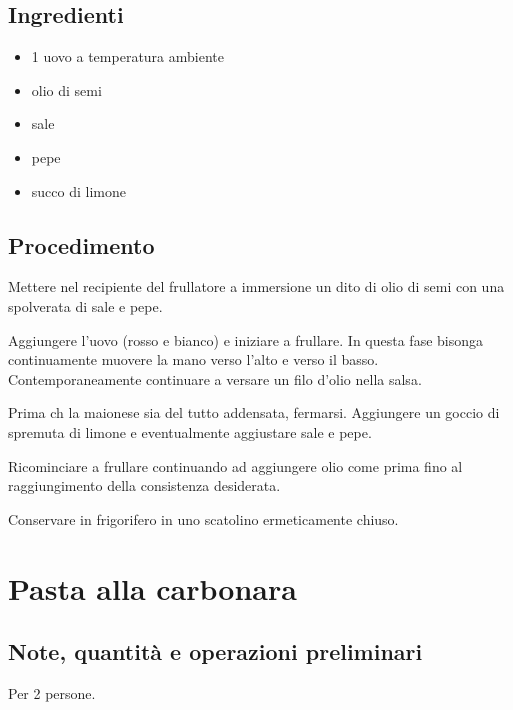 \documentclass[12pt]{article}
\begin{document}
\begin{multicols}{2}
\subsection*{Ingredienti}
\begin{itemize}
	\item 1 uovo a temperatura ambiente
	\item olio di semi
	\item sale
	\item pepe
	\item succo di limone
\end{itemize}

\vspace*{\fill}

\columnbreak
\subsection*{Procedimento}

Mettere nel recipiente del frullatore a immersione un dito di olio di semi
con una spolverata di sale e pepe.
\medskip

Aggiungere l'uovo (rosso e bianco) e iniziare a frullare.
In questa fase bisonga continuamente muovere la mano verso l'alto e verso il basso.
Contemporaneamente continuare a versare un filo d'olio nella salsa.
\medskip

Prima ch la maionese sia del tutto addensata, fermarsi.
Aggiungere un goccio di spremuta di limone e eventualmente aggiustare sale e pepe.
\medskip

Ricominciare a frullare continuando ad aggiungere olio come prima
fino al raggiungimento della consistenza desiderata.
\medskip

Conservare in frigorifero in uno scatolino ermeticamente chiuso.

\end{multicols}

\newpage


\section{Pasta alla carbonara}

\subsection*{Note, quantità e operazioni preliminari}
Per 2 persone.
\end{document}
